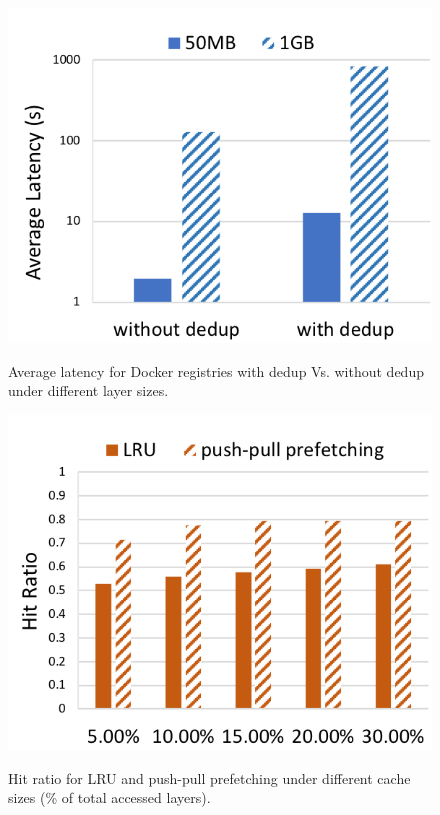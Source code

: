 \begin{figure}[t]
	\centering
	\begin{minipage}{0.225\textwidth}
		\centering
		\includegraphics[width=1\textwidth]{graphs/avglatency_dedup_nodedup.png}
		\caption{Average latency for Docker registries with dedup Vs. without dedup under different layer sizes.}
		\label{fig:avg_latency_dedup_nodedup}
	\end{minipage}
	\begin{minipage}{0.225\textwidth}
		\centering
		\includegraphics[width=1\textwidth]{graphs/lru_prefetch_hits.png}
		\caption{Hit ratio for LRU and push-pull prefetching under different cache sizes (\% of total accessed layers).}
		\vspace{-3pt}
		\label{fig:lru_prefetching_hits}
	\end{minipage}
\end{figure}
